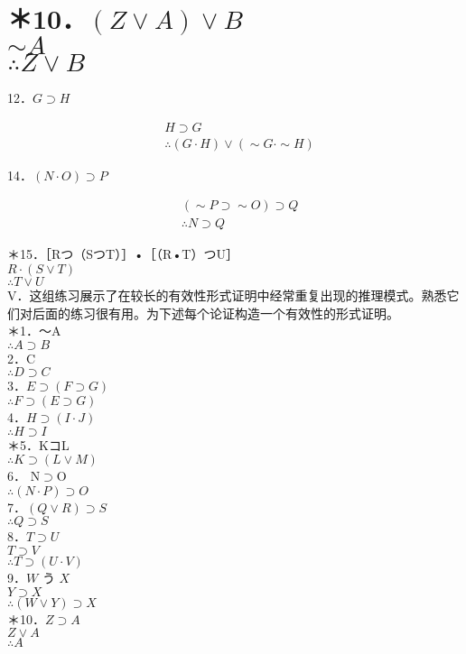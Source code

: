 \section*{＊10．$(Z \vee A) \vee B$ \\
 $\sim A$ \\
 $\therefore Z \vee B$}
12．$G \supset H$

$$
\begin{aligned}
& H \supset G \\
& \therefore(G \cdot H) \vee(\sim G \cdot \sim H)
\end{aligned}
$$

14．$(N \cdot O) \supset P$

$$
\begin{aligned}
& (\sim P \supset \sim O) \supset Q \\
& \therefore N \supset Q
\end{aligned}
$$

＊15．［Rつ（SつT）］•［（R•T）つU］\\
$R \cdot(S \vee T)$\\
$\therefore T \vee U$\\
V．这组练习展示了在较长的有效性形式证明中经常重复出现的推理模式。熟悉它们对后面的练习很有用。为下述每个论证构造一个有效性的形式证明。\\
＊1．～A\\
$\therefore A \supset B$\\
2．C\\
$\therefore D \supset C$\\
3．$E \supset(F \supset G)$\\
$\therefore F \supset(E \supset G)$\\
4．$H \supset(I \cdot J)$\\
$\therefore H \supset I$\\
＊5．KコL\\
$\therefore K \supset(L \vee M)$\\
6． $\mathrm{N} \supset \mathrm{O}$\\
$\therefore(N \cdot P) \supset O$\\
7．$(Q \vee R) \supset S$\\
$\therefore Q \supset S$\\
8．$T \supset U$\\
$T \supset V$\\
$\therefore T \supset(U \cdot V)$\\
9．$W$ う $X$\\
$Y \supset X$\\
$\therefore(W \vee Y) \supset X$\\
＊10．$Z \supset A$\\
$Z \vee A$\\
$\therefore A$

